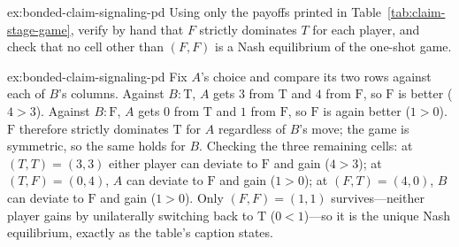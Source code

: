 \documentclass[11pt,a4paper]{article}
\theoremstyle{definition}
\theoremstyle{remark}
\begin{document}

\begin{pdexercise}[kind=Check,rating=1]{ex:bonded-claim-signaling-pd}
Using only the payoffs printed in Table~\ref{tab:claim-stage-game}, verify by hand that $F$ strictly dominates $T$ for each player, and check that no cell other than $(F,F)$ is a Nash equilibrium of the one-shot game.
\end{pdexercise}
\begin{pdsolution}{ex:bonded-claim-signaling-pd}
Fix $A$'s choice and compare its two rows against each of $B$'s columns. Against $B{:}\mathrm{T}$, $A$ gets $3$ from $\mathrm{T}$ and $4$ from $\mathrm{F}$, so $\mathrm{F}$ is better ($4>3$). Against $B{:}\mathrm{F}$, $A$ gets $0$ from $\mathrm{T}$ and $1$ from $\mathrm{F}$, so $\mathrm{F}$ is again better ($1>0$). $\mathrm{F}$ therefore strictly dominates $\mathrm{T}$ for $A$ regardless of $B$'s move; the game is symmetric, so the same holds for $B$. Checking the three remaining cells: at $(T,T)=(3,3)$ either player can deviate to $\mathrm{F}$ and gain ($4>3$); at $(T,F)=(0,4)$, $A$ can deviate to $\mathrm{F}$ and gain ($1>0$); at $(F,T)=(4,0)$, $B$ can deviate to $\mathrm{F}$ and gain ($1>0$). Only $(F,F)=(1,1)$ survives---neither player gains by unilaterally switching back to $\mathrm{T}$ ($0<1$)---so it is the unique Nash equilibrium, exactly as the table's caption states.


\end{pdsolution}
\end{document}
